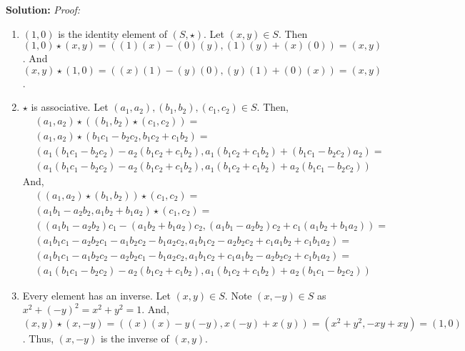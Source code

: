 \documentclass[12pt, letterpaper]{article}
\newenvironment{solution}
    [0]
    {\noindent \textbf{Solution:}} 
    {\vspace{3mm}}
\begin{document}
    \begin{solution}
        \emph{Proof:}
        \begin{enumerate}
            \item $(1, 0)$ is the identity element of $(S, \star)$. Let $(x, y) \in S$.
            Then $(1, 0) \star (x, y) = ((1)(x) - (0)(y), (1)(y) + (x)(0)) = (x, y)$.
            And $(x, y) \star (1, 0) = ((x)(1) - (y)(0), (y)(1) + (0)(x)) = (x, y)$.

            \item $\star$ is associative. Let $(a_1, a_2), (b_1, b_2), (c_1, c_2) \in S$. Then,
            \begin{align*}
                &(a_1, a_2) \star ((b_1, b_2) \star (c_1, c_2)) =\\ 
                &(a_1, a_2) \star (b_1 c_1 - b_2 c_2, b_1 c_2 + c_1 b_2) =\\
                &(a_1(b_1 c_1 - b_2 c_2) - a_2(b_1 c_2 + c_1 b_2), a_1(b_1 c_2 + c_1 b_2) + (b_1 c_1 - b_2 c_2)a_2) =\\
                &(a_1(b_1 c_1 - b_2 c_2) - a_2(b_1 c_2 + c_1 b_2), a_1(b_1 c_2 + c_1 b_2) + a_2(b_1 c_1 - b_2 c_2))
            \end{align*}
            And,
            \begin{align*}
                &((a_1, a_2) \star (b_1, b_2)) \star (c_1, c_2) =\\ 
                &(a_1 b_1 - a_2 b_2, a_1 b_2 + b_1 a_2) \star (c_1, c_2) =\\
                &((a_1 b_1 - a_2 b_2)c_1 - (a_1 b_2 + b_1 a_2)c_2, (a_1 b_1 - a_2 b_2)c_2 + c_1(a_1 b_2 + b_1 a_2))=\\
                &(a_1b_1c_1 - a_2b_2c_1 - a_1b_2c_2 - b_1a_2c_2, a_1b_1c_2 - a_2b_2c_2 + c_1a_1b_2 + c_1b_1a_2) =\\
                &(a_1b_1c_1 - a_1b_2c_2 - a_2b_2c_1 - b_1a_2c_2, a_1b_1c_2 + c_1a_1b_2 - a_2b_2c_2  + c_1b_1a_2) =\\
                &(a_1(b_1 c_1 - b_2 c_2) - a_2(b_1 c_2 + c_1 b_2), a_1(b_1 c_2 + c_1 b_2) + a_2(b_1 c_1 - b_2 c_2))
            \end{align*}

            \item Every element has an inverse. Let $(x, y) \in S$. Note $(x, -y) \in S$ as $x^2 + {(-y)}^2 = x^2 + y^2 = 1$.
            And, $(x, y) \star (x, -y) = ((x)(x) - y(-y), x(-y) + x(y)) = (x^2 + y^2, -xy + xy) = (1, 0)$. Thus, $(x, -y)$ is
            the inverse of $(x, y)$.
        \end{enumerate}
    \end{solution}
\end{document}
